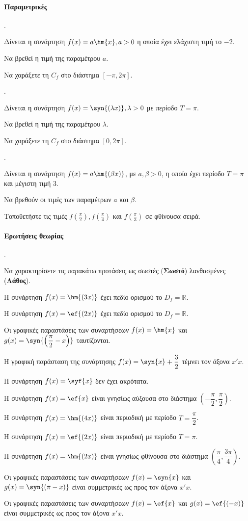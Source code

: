 \documentclass[11pt,a4paper,twocolumn]{article}
\newcounter{askhsh}
\newcommand{\askhsh}{\large\theaskhsh.\ \addtocounter{askhsh}{1}}
\begin{document}
\paragraph{Παραμετρικές}
\askhsh Δίνεται η συνάρτηση $f(x)=a\hm{x}, a>0$ η οποία έχει ελάχιστη τιμή το $-2$.
\begin{alist}
\item Να βρεθεί η τιμή της παραμέτρου $a$.
\item Να χαράξετε τη $C_f$ στο διάστημα $[-\pi,2\pi]$.
\end{alist}
\askhsh Δίνεται η συνάρτηση $f(x)=\syn{(\lambda x)}, \lambda>0$ με περίοδο $T=\pi$.
\begin{alist}
\item Να βρεθεί η τιμή της παραμέτρου $\lambda$.
\item Να χαράξετε τη $C_f$ στο διάστημα $[0,2\pi]$.
\end{alist}
\askhsh Δίνεται η συνάρτηση $f(x)=a\hm{(\beta x)}$, με $a,\beta>0$, η οποία έχει περίοδο $T=\pi$ και μέγιστη τιμή $3$.
\begin{alist}
\item Να βρεθούν οι τιμές των παραμέτρων $a$ και $\beta$.
\item Τοποθετήστε τις τιμές $f\left(\frac{\pi}{2}\right),f\left(\frac{\pi}{4}\right)$ και $f\left(\frac{\pi}{3}\right)$ σε φθίνουσα σειρά.
\item 
\end{alist}
\paragraph{Ερωτήσεις θεωρίας}
\askhsh Να χαρακτηρίσετε τις παρακάτω προτάσεις ως σωστές (\textbf{Σωστό}) λανθασμένες (\textbf{Λάθος}).
\begin{alist}
\item Η συνάρτηση $f(x)=\hm{(3x)}$ έχει πεδίο ορισμού το $D_f=\mathbb{R}$.
\item Η συνάρτηση $f(x)=\ef{(2x)}$ έχει πεδίο ορισμού το $D_f=\mathbb{R}$.
\item Οι γραφικές παραστάσεις των συναρτήσεων $f(x)=\hm{x}$ και $g(x)=\syn{\left(\dfrac{\pi}{2}-x\right)}$ ταυτίζονται.
\item Η γραφική παράσταση της συνάρτησης $f(x)=\syn{x}+\dfrac{3}{2}$ τέμνει τον άξονα $x'x$.
\item Η συνάρτηση $f(x)=\syf{x}$ δεν έχει ακρότατα.
\item Η συνάρτηση $f(x)=\ef{x}$ είναι γνησίως αύξουσα στο διάστημα $\left(-\dfrac{\pi}{2},\dfrac{\pi}{2}\right)$.
\item Η συνάρτηση $f(x)=\hm{(4x)}$ είναι περιοδική με περίοδο $T=\dfrac{\pi}{2}$.
\item Η συνάρτηση $f(x)=\ef{(2x)}$ είναι περιοδική με περίοδο $T=\pi$.
\item Η συνάρτηση $f(x)=\hm{(2x)}$ είναι γνησίως φθίνουσα στο διάστημα $\left(\dfrac{\pi}{4},\dfrac{3\pi}{4}\right)$.
\item Οι γραφικές παραστάσεις των συναρτήσεων $f(x)=\syn{x}$ και $g(x)=\syn{(\pi-x)}$ είναι συμμετρικές ως προς τον άξονα $x'x$.
\item Οι γραφικές παραστάσεις των συναρτήσεων $f(x)=\ef{x}$ και $g(x)=\ef{(-x)}$ είναι συμμετρικές ως προς τον άξονα $x'x$.
\end{alist}
\end{document}

